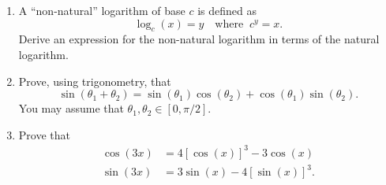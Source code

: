 \documentclass[10pt,a4paper]{article}
\begin{document}
\begin{enumerate}
\item
  A ``non-natural'' logarithm of base $c$ is defined as
  \begin{equation}
    \log_c(x) = y \quad\mathrm{where}\;\; c^y = x.
  \end{equation}
  Derive an expression for the non-natural logarithm in terms of the
  natural logarithm.

\item
  Prove, using trigonometry, that
  \begin{equation}
    \sin(\theta_1 + \theta_2) = \sin(\theta_1) \cos(\theta_2) + \cos(\theta_1)\sin(\theta_2).
  \end{equation}
  You may assume that $\theta_1, \theta_2 \in [0, \pi/2].$

\item
  Prove that
  \begin{align}
    \cos(3x) &= 4[\cos(x)]^3 -3\cos(x) \\
    \sin(3x) &= 3\sin(x)-4[\sin(x)]^3.
  \end{align}
\end{enumerate}
\end{document}
